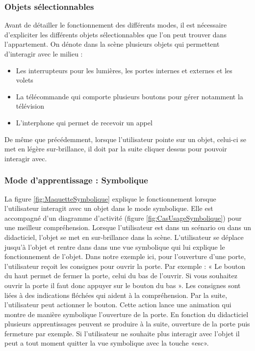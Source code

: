 \subsubsection{Objets sélectionnables}

Avant de détailler le fonctionnement des différents modes, il est nécessaire d'expliciter les différents objets sélectionnables que l'on peut trouver dans l'appartement. On dénote dans la scène plusieurs objets qui permettent d'interagir avec le milieu :
\begin{itemize}
	\item Les interrupteurs pour les lumières, les portes internes et externes et les volets
	\item La télécommande qui comporte plusieurs boutons pour gérer notamment la télévision
	\item L'interphone qui permet de recevoir un appel
\end{itemize}

De même que précédemment, lorsque l'utilisateur pointe sur un objet, celui-ci se met en légère sur-brillance, il doit par la suite cliquer dessus pour pouvoir interagir avec. %


\subsubsection{Mode d'apprentissage : Symbolique}

La figure \ref{fig:MaquetteSymbolique} explique le fonctionnement lorsque l'utilisateur interagit avec un objet dans le mode symbolique. Elle est accompagné d'un diagramme d'activité (figure \ref{fig:CasUsageSymbolique}) pour une meilleur compréhension.
\newline
Lorsque l'utilisateur est dans un scénario ou dans un didacticiel, l'objet se met en sur-brillance dans la scène. L'utilisateur se déplace jusqu'à l'objet et rentre dans dans une vue symbolique qui lui explique le fonctionnement de l'objet. Dans notre exemple ici, pour l'ouverture d'une porte, l'utilisateur reçoit les consignes pour ouvrir la porte. Par exemple : « Le bouton du haut permet de fermer la porte, celui du bas de l'ouvrir. Si vous souhaitez ouvrir la porte il faut donc appuyer sur le bouton du bas ». Les consignes sont liées à des indications fléchées qui aident à la compréhension. Par la suite, l'utilisateur peut actionner le bouton. Cette action lance une animation qui montre de manière symbolique l'ouverture de la porte.
\newline
En fonction du didacticiel plusieurs apprentissages peuvent se produire à la suite, ouverture de la porte puis fermeture par exemple. Si l'utilisateur ne souhaite plus interagir avec l'objet il peut a tout moment quitter la vue symbolique avec la touche «esc».

